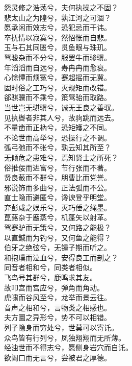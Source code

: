 \documentclass[]{article}
\begin{document}
怨灵修之浩荡兮，夫何执操之不固？\\
悲太山之为隍兮，孰江河之可涸？\\
愿承闲而效志兮，恐犯忌而干讳。\\
卒抚情以寂寞兮，然怊怅而自悲。\\
玉与石其同匮兮，贯鱼眼与珠玑。\\
驽骏杂而不分兮，服罢牛而骖骥。\\
年滔滔而自远兮，寿冉冉而愈衰。\\
心悇憛而烦冤兮，蹇超摇而无冀。\\
固时俗之工巧兮，灭规矩而改错。\\
郤骐骥而不乘兮，策驽骀而取路。\\
当世岂无骐骥兮，诚无王良之善驭。\\
见执辔者非其人兮，故驹跳而远去。\\
不量凿而正枘兮，恐矩矱之不同。\\
不论世而高举兮，恐操行之不调。\\
弧弓弛而不张兮，孰云知其所至？\\
无倾危之患难兮，焉知贤士之所死？\\
俗推佞而进富兮，节行张而不著。\\
贤良蔽而不群兮，朋曹比而党誉。\\
邪说饰而多曲兮，正法弧而不公。\\
直士隐而避匿兮，谗谀登乎明堂。\\
弃彭咸之娱乐兮，灭巧倕之绳墨。\\
菎蕗杂于黀蒸兮，机蓬矢以射革。\\
驾蹇驴而无策兮，又何路之能极？\\
以直鍼而为钓兮，又何鱼之能得？\\
伯牙之绝弦兮，无锺子期而听之。\\
和抱璞而泣血兮，安得良工而剖之？\\
同音者相和兮，同类者相似。\\
飞鸟号其群兮，鹿鸣求其友。\\
故叩宫而宫应兮，弹角而角动。\\
虎啸而谷风至兮，龙举而景云往。\\
音声之相和兮，言物类之相感也。\\
夫方圜之异形兮，势不可以相错。\\
列子隐身而穷处兮，世莫可以寄讬。\\
众鸟皆有行列兮，凤独翔翔而无所薄。\\
经浊世而不得志兮，愿侧身岩穴而自讬。\\
欲阖口而无言兮，尝被君之厚德。\\
\end{document}
